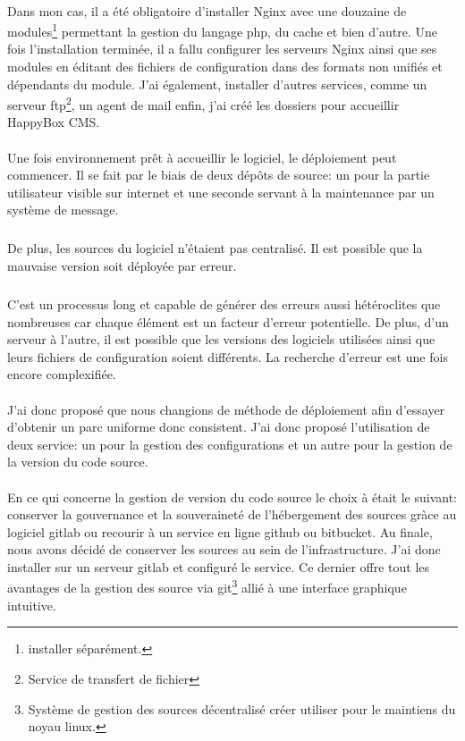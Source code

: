 \documentclass[11pt, a4paper ]{article}
\begin{document}
\begin{spacing}{1.5}
\paragraph{}
Dans mon cas, il a été obligatoire d'installer Nginx avec une douzaine de modules\footnote{installer séparément.} permettant la gestion du langage php, du cache et bien d'autre. Une fois l'installation terminée, il a fallu configurer les serveurs Nginx ainsi que ses modules en éditant des fichiers de configuration dans des formats non unifiés et dépendants du module. J'ai également, installer d'autres services, comme un serveur ftp\footnote{Service de transfert de fichier}, un agent de mail enfin, j'ai créé les dossiers pour accueillir HappyBox CMS.
\paragraph{}
Une fois environnement prêt à accueillir le logiciel, le déploiement peut commencer. Il se fait par le biais de deux dépôts de source: un pour la partie utilisateur visible sur internet et une seconde servant à la maintenance par un système de message.
\subparagraph{}
De plus, les sources du logiciel n'étaient pas centralisé. Il est possible que la mauvaise version soit déployée par erreur.
\subparagraph{}
C'est un processus long et capable de générer des erreurs aussi hétéroclites que nombreuses car chaque élément est un facteur d'erreur potentielle. De plus, d'un serveur à l'autre, il est possible que les versions des logiciels utilisées ainsi que leurs fichiers de configuration soient différents. La recherche d'erreur est une fois encore complexifiée.
\paragraph{}
J'ai donc proposé que nous changions de méthode de déploiement afin d'essayer d'obtenir un parc uniforme donc consistent. J'ai donc proposé l'utilisation de deux service: un pour la gestion des configurations et un autre pour la gestion de la version du code source.
\paragraph{}
En ce qui concerne la gestion de version du code source le choix à était le suivant: conserver la gouvernance et la souveraineté de l'hébergement des sources gràce au logiciel gitlab ou recourir à un service en ligne github ou bitbucket. Au finale, nous avons décidé de conserver les sources au sein de l'infrastructure. J'ai donc installer sur un serveur gitlab et configuré le service. Ce dernier offre tout les avantages de la gestion des source via git\footnote{Système de gestion des sources décentralisé créer utiliser pour le maintiens du noyau linux.} allié à une interface graphique intuitive.

\end{spacing}
\end{document}
